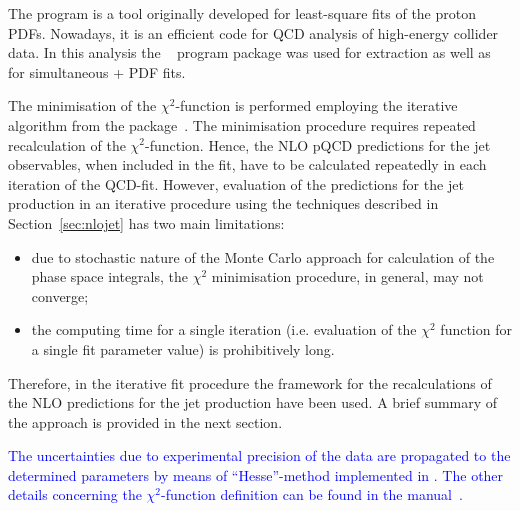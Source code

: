 The \herafitter program is a tool originally developed for least-square fits of the proton PDFs. Nowadays, it is an efficient code for QCD analysis of high-energy collider data. In this analysis the \herafitter~\cite{Aaron:2009aa,Aaron:2009kv} program package was used for \as extraction as well as for simultaneous \as+ PDF fits.

The minimisation of the $\chi^2$-function is performed employing the iterative \migrad algorithm from the \minuit package~\cite{James:1975dr}. The minimisation procedure requires repeated recalculation of the $\chi^2$-function. Hence, the NLO pQCD predictions for the jet observables, when included in the fit, have to be calculated repeatedly in each iteration of the QCD-fit. However, evaluation of the predictions for the jet production in an iterative procedure using the techniques described in Section~\ref{sec:nlojet} has two main limitations: 
\begin{itemize}
 \item due to stochastic nature of the Monte Carlo approach for calculation of the phase space integrals, the $\chi^2$ minimisation procedure,  in general, may not converge;
 \item the computing time for a single iteration (i.e. evaluation of the $\chi^2$ function for a single fit parameter value) is prohibitively long.
\end{itemize}
Therefore, in the iterative fit procedure the \fastnlo framework for the recalculations of the NLO predictions for the jet production have been used. A brief summary of the \fastnlo approach is provided in the next section. 

\textcolor{blue}{The uncertainties due to experimental precision of the data are propagated to the determined parameters by means of ``Hesse''-method implemented in \minuit. The other details concerning the $\chi^2$-function definition can be found in the \herafitter manual~\cite{herafitter:2014:manual}.} 